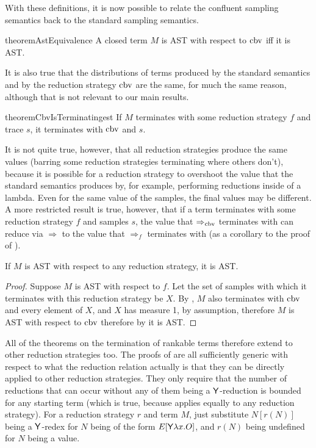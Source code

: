 With these definitions, it is now possible to relate the confluent sampling semantics back to the standard sampling semantics.

\begin{restatable}{theorem}{AstEquivalence} \label{thm:AstEquivalence}
A closed term $M$ is AST with respect to $\operatorname{cbv}$ iff it is AST.
\end{restatable}

It is also true that the distributions of terms produced by the standard semantics and by the reduction strategy $\operatorname{cbv}$ are the same, for much the same reason, although that is not relevant to our main results.

\begin{restatable}{theorem}{CbvIsTerminatingest} \label{thm:CbvIsTerminatingest}
If $M$ terminates with some reduction strategy $f$ and trace $s$, it terminates with $\operatorname{cbv}$ and $s$.
\end{restatable}

It is not quite true, however, that all reduction strategies produce the same values (barring some reduction strategies terminating where others don't), because it is possible for a reduction strategy to overshoot the value that the standard semantics produces by, for example, performing reductions inside of a lambda. Even for the same value of the samples, the final values may be different. A more restricted result is true, however, that if a term terminates with some reduction strategy $f$ and samples $s$, the value that $\Rightarrow_{\operatorname{cbv}}$ terminates with can reduce via $\Rightarrow$ to the value that $\Rightarrow_f$ terminates with (as a corollary to the proof of ).

\begin{corollary}
If $M$ is AST with respect to any reduction strategy, it is AST.
\end{corollary}
\begin{proof}
Suppose $M$ is AST with respect to $f$. Let the set of samples with which it terminates with this reduction strategy be $X$. By , $M$ also terminates with $\operatorname{cbv}$ and every element of $X$, and $X$ has measure 1, by assumption, therefore $M$ is AST with respect to $\operatorname{cbv}$ therefore by  it is AST.
\end{proof}

All of the theorems on the termination of rankable terms therefore extend to other reduction strategies too. The proofs of  are all sufficiently generic with respect to what the reduction relation actually is that they can be directly applied to other reduction strategies. They only require that the number of reductions that can occur without any of them being a $\mathsf{Y}$-reduction is bounded for any starting term (which is true, because  applies equally to any reduction strategy). For a reduction strategy $r$ and term $M$, just substitute $N[r(N)]$ being a $\mathsf{Y}$-redex for $N$ being of the form $E[\mathsf{Y} \lambda x. O]$, and $r(N)$ being undefined for $N$ being a value.

